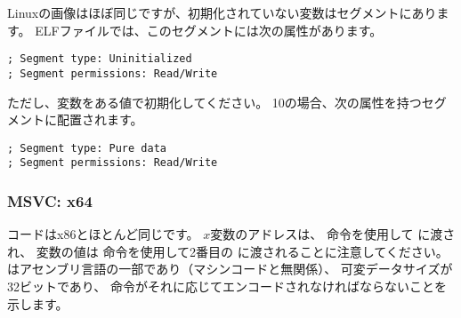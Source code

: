Linuxの画像はほぼ同じですが、初期化されていない変数はセグメントにあります。 
\ac{ELF}ファイルでは、このセグメントには次の属性があります。

\begin{lstlisting}
; Segment type: Uninitialized
; Segment permissions: Read/Write
\end{lstlisting}

ただし、変数をある値で初期化してください。 
10の場合、次の属性を持つセグメントに配置されます。

\begin{lstlisting}
; Segment type: Pure data
; Segment permissions: Read/Write
\end{lstlisting}

\subsubsection{MSVC: x64}



コードはx86とほとんど同じです。 
$x$変数のアドレスは、 \LEA 命令を使用して \scanf に渡され、
変数の値は \MOV 命令を使用して2番目の \printf に渡されることに注意してください。 
はアセンブリ言語の一部であり（マシンコードと無関係）、
可変データサイズが32ビットであり、 \MOV 命令がそれに応じてエンコードされなければならないことを示します。
